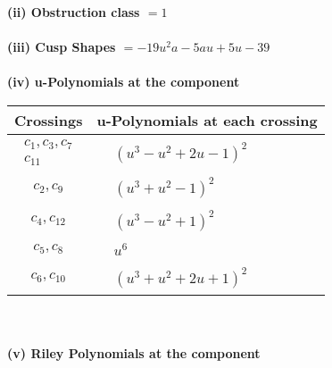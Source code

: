 \documentclass[1p]{elsarticle_modified}
\theoremstyle{definition}
\begin{document}
\flushleft \textbf{(ii) Obstruction class $= 1$}\\~\\
\flushleft \textbf{(iii) Cusp Shapes $= -19 u^2 a-5 a u+5 u-39$}\\~\\
\newpage\renewcommand{\arraystretch}{1}
\flushleft \textbf{(iv) u-Polynomials at the component}\newline \\
\begin{tabular}{m{50pt}|m{274pt}}
Crossings & \hspace{64pt}u-Polynomials at each crossing \\
\hline $$\begin{aligned}c_{1},c_{3},c_{7}\\c_{11}\end{aligned}$$&$\begin{aligned}
&(u^3- u^2+2 u-1)^2
\end{aligned}$\\
\hline $$\begin{aligned}c_{2},c_{9}\end{aligned}$$&$\begin{aligned}
&(u^3+u^2-1)^2
\end{aligned}$\\
\hline $$\begin{aligned}c_{4},c_{12}\end{aligned}$$&$\begin{aligned}
&(u^3- u^2+1)^2
\end{aligned}$\\
\hline $$\begin{aligned}c_{5},c_{8}\end{aligned}$$&$\begin{aligned}
&u^6
\end{aligned}$\\
\hline $$\begin{aligned}c_{6},c_{10}\end{aligned}$$&$\begin{aligned}
&(u^3+u^2+2 u+1)^2
\end{aligned}$\\
\hline
\end{tabular}\\~\\
\newpage\renewcommand{\arraystretch}{1}
\flushleft \textbf{(v) Riley Polynomials at the component}\newline \\
\end{document}
